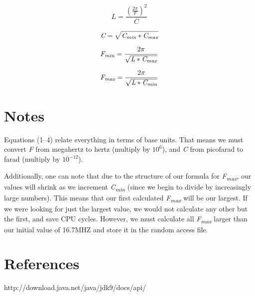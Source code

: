 \documentclass[12pt]{article}
\begin{document}
    \par %
\begin{equation}
\textit{L} = \frac{(\frac{2\pi}{\textit{F}})^2}{\textit{C}}
\end{equation}

\begin{equation}
\textit{C} = \sqrt{\textit{C\textsubscript{min}}*\textit{C\textsubscript{max}}}
\end{equation}

\begin{equation}
\textit{F\textsubscript{min}} = \frac{2\pi}{\sqrt{\textit{L}*\textit{C\textsubscript{max}}}}
\end{equation}

\begin{equation}
\textit{F\textsubscript{max}} = \frac{2\pi}{\sqrt{\textit{L}*\textit{C\textsubscript{min}}}}
\end{equation}


\section*{Notes}
 Equations (1--4) relate everything in terms of base units. That means we must convert \textit{F} from megahertz to hertz (multiply by $10^6$), and \textit{C} from picofarad to farad (multiply by $10^{-12}$).

    \par %
Additionally, one can note that due to the structure of our formula for \textit{F\textsubscript{max}}, our values will shrink as we increment \textit{C\textsubscript{min}} (since we begin to divide by increasingly large numbers). This means that our first calculated  \textit{F\textsubscript{max}} will be our largest. If we were looking for just the largest value, we would not calculate any other but the first, and save CPU cycles. However, we must calculate all \textit{F\textsubscript{max}} larger than our initial value of 16.7MHZ and store it in the random access file.

\section*{References}
http://download.java.net/java/jdk9/docs/api/
\end{document}
